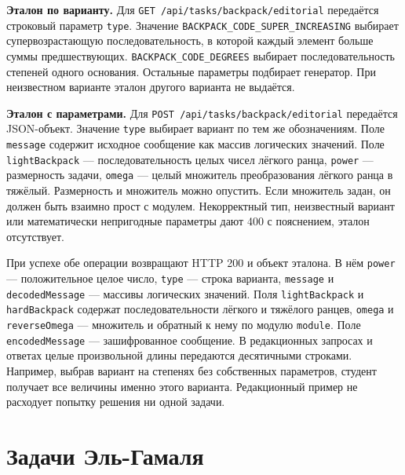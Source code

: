 \documentclass[12pt,a4paper]{article}
\begin{document}
\textbf{Эталон по варианту.} Для \texttt{GET /\allowbreak{}api/\allowbreak{}tasks/\allowbreak{}backpack/\allowbreak{}editorial} передаётся строковый параметр \texttt{type}. Значение \texttt{BACKPACK\_\allowbreak{}CODE\_\allowbreak{}SUPER\_\allowbreak{}INCREASING} выбирает супервозрастающую последовательность, в которой каждый элемент больше суммы предшествующих. \texttt{BACKPACK\_\allowbreak{}CODE\_\allowbreak{}DEGREES} выбирает последовательность степеней одного основания. Остальные параметры подбирает генератор. При неизвестном варианте эталон другого варианта не выдаётся.

\textbf{Эталон с параметрами.} Для \texttt{POST /\allowbreak{}api/\allowbreak{}tasks/\allowbreak{}backpack/\allowbreak{}editorial} передаётся JSON-объект. Значение \texttt{type} выбирает вариант по тем же обозначениям. Поле \texttt{message} содержит исходное сообщение как массив логических значений. Поле \texttt{light\allowbreak{}Backpack} --- последовательность целых чисел лёгкого ранца, \texttt{power} --- размерность задачи, \texttt{omega} --- целый множитель преобразования лёгкого ранца в тяжёлый. Размерность и множитель можно опустить. Если множитель задан, он должен быть взаимно прост с модулем. Некорректный тип, неизвестный вариант или математически непригодные параметры дают 400 с пояснением, эталон отсутствует.

При успехе обе операции возвращают HTTP 200 и объект эталона. В нём \texttt{power} --- положительное целое число, \texttt{type} --- строка варианта, \texttt{message} и \texttt{decoded\allowbreak{}Message} --- массивы логических значений. Поля \texttt{light\allowbreak{}Backpack} и \texttt{hard\allowbreak{}Backpack} содержат последовательности лёгкого и тяжёлого ранцев, \texttt{omega} и \texttt{reverse\allowbreak{}Omega} --- множитель и обратный к нему по модулю \texttt{module}. Поле \texttt{encoded\allowbreak{}Message} --- зашифрованное сообщение. В редакционных запросах и ответах целые произвольной длины передаются десятичными строками. Например, выбрав вариант на степенях без собственных параметров, студент получает все величины именно этого варианта. Редакционный пример не расходует попытку решения ни одной задачи.

\section{Задачи Эль-Гамаля}\label{ux437ux430ux434ux430ux447ux438-ux44dux43bux44c-ux433ux430ux43cux430ux43bux44f}

\hypertarget{задачи-эль-гамаля}{}
\end{document}
